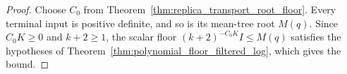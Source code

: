 \begin{proof}
    \leanok
    Choose $C_0$ from Theorem~\ref{thm:replica_transport_root_floor}.
    Every terminal input is positive definite, and so is its mean-tree
    root $M(q)$. Since $C_0K\ge0$ and $k+2\ge1$, the scalar floor
    $(k+2)^{-C_0K}I\le M(q)$ satisfies the hypotheses of
    Theorem~\ref{thm:polynomial_floor_filtered_log}, which gives the bound.
\end{proof}
